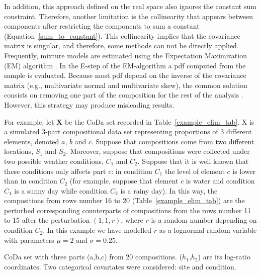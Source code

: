 \documentclass[12pt, a4paper]{article}
\begin{document}
In addition, this approach defined on the real space also ignores the constant sum constraint. Therefore, another limitation is the collinearity that appears between components  after restricting the components to sum a constant (Equation~\ref{sum_to_constant}). This collinearity implies that the covariance matrix is singular, and therefore, some methods can not be directly applied. Frequently, mixture models are estimated using the Expectation Maximization (EM) algorithm \citep{dempster1977maximum}. In the E-step of the EM-algorithm a pdf computed from the sample is evaluated. Because most pdf depend on the inverse of the covariance matrix (e.g., multivariate normal and multivariate skew), the common solution consists on removing one part of the composition for the rest of the analysis \citep{papageorgiou2001model}. However, this strategy may  produce misleading results.   

For example, let $\mathbf{X}$ be the CoDa set recorded in Table~\ref{example_elim_tab}. X is a simulated $3$-part compositional data set representing proportions of $3$ different elements, denoted $a$, $b$ and $c$. Suppose that compositions come from two different locations, $S_1$ and $S_2$. Moreover, suppose that compositions were collected under two possible weather conditions, $C_1$ and $C_2$. Suppose that it is well known
that these conditions only affects part $c$: in condition $C_1$ the level of element $c$ is lower than in condition $C_2$ (for example, suppose that element $c$ is water and condition $C_1$ is a sunny day while condition $C_2$ is a rainy day). In this way, the compositions from rows number 16 to 20 (Table~\ref{example_elim_tab}) are the perturbed corresponding counterparts of compositions from the
rows number 11 to 15 after the perturbation $(1,1,r)$, where $r$ is a random number depending on condition $C_2$. In this example we have modelled $r$ as a lognormal random variable with parameters $\mu=2$ and $\sigma=0.25$. 
\begin{table}[htpb]
\centering
\scriptsize

\caption{CoDa set with three parts (a,b,c) from 20 compositions. ($h_1$,$h_2$) are its log-ratio coordinates.
Two categorical covariates were considered: site and condition. }
\label{example_elim_tab}
\end{table}
\end{document}
